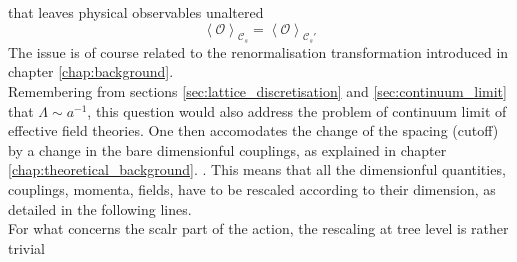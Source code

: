 that leaves physical observables unaltered
\begin{equation}
\left\langle\mathcal{O}\right\rangle_{\mathcal{C}_s} = \left\langle\mathcal{O}\right\rangle_{\mathcal{C}_s'}
\end{equation}
The issue is of course related to the renormalisation transformation introduced in chapter \ref{chap:background}. \\
Remembering from sections \ref{sec:lattice_discretisation} and \ref{sec:continuum_limit} that $\Lambda \sim a^{-1}$, this question would also address the problem of continuum limit of effective field theories. 
One then accomodates the change of the spacing (cutoff) by a change in the bare dimensionful couplings, as explained in chapter \ref{chap:theoretical_background}. . This means that all the dimensionful quantities, couplings, momenta, fields, have to be rescaled according to their dimension, as detailed in the following lines. \\
For what concerns the scalr part of the action, the rescaling at tree level is rather trivial \cite{Pawlowski2017CoolingNoise,attanasio2022low}

